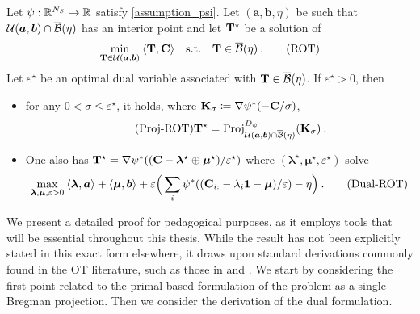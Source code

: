 \begin{proposition}\label{prop:cot}
    Let $\psi : \mathbb{R}^{N_S} \to \mathbb{R}$ satisfy \cref{assumption_psi}. Let $(\bm{a}, \bm{b}, \eta)$ be such that ${\mathcal{U}}(\bm{a}, \bm{b}) \cap \overline{\mathcal{B}}(\eta)$ has an interior point and let ${\mathbf{T}}^\star$ be a solution of
\begin{align}
    \min_{{\mathbf{T}} \in {\mathcal{U}}(\bm{a}, \bm{b})} \: \langle {\mathbf{T}}, {\mathbf{C}} \rangle \quad \text{s.t.} \quad  {\mathbf{T}} \in \overline{\mathcal{B}}(\eta) \:.
    \tag{ROT}
\end{align}
    Let $\varepsilon^\star$ be an optimal dual variable associated with ${\mathbf{T}} \in \overline{\mathcal{B}}(\eta)$.
    If $\varepsilon^\star > 0$, then
    \begin{itemize}[leftmargin=*, labelsep=0.1em]
        \item for any $0 < \sigma \leq \varepsilon^\star$, it holds, where ${\mathbf{K}}_\sigma \coloneqq \nabla \psi^*(-{\mathbf{C}}/ \sigma)$, 
        \begin{align}\label{eq:proj-rot}\tag{Proj-ROT}
            {\mathbf{T}}^\star = \operatorname{Proj}^{D_\psi}_{{\mathcal{U}}(\bm{a}, \bm{b}) \cap \overline{\mathcal{B}}(\eta)}({\mathbf{K}}_\sigma) \:.
        \end{align}
        \item One also has ${\mathbf{T}}^\star = \nabla \psi^*(({\mathbf{C}} - \bm{\lambda}^\star \oplus \bm{\mu}^\star) / \varepsilon^\star)$
        where $(\bm{\lambda}^\star, \bm{\mu}^\star, \varepsilon^\star)$ solve
        \begin{align}\label{eq:dual-rot}
            \max_{\bm{\lambda}, \bm{\mu}, \varepsilon>0}  \: \langle \bm{\lambda}, \bm{a} \rangle + \langle \bm{\mu}, \bm{b} \rangle + \varepsilon \Big(\sum_i \psi^*((\mathbf{C}_{i:} - \lambda_i \bm{1} - \bm{\mu}) / \varepsilon) - \eta \Big) \:.
        \tag{Dual-ROT}
        \end{align}
    \end{itemize}
\end{proposition}

We present a detailed proof for pedagogical purposes, as it employs tools that will be essential throughout this thesis. While the result has not been explicitly stated in this exact form elsewhere, it draws upon standard derivations commonly found in the OT literature, such as those in \citep{peyre2019computational} and \citep{blondel2018smooth}. We start by considering the first point related to the primal based formulation of the problem as a single Bregman projection. Then we consider the derivation of the dual formulation.

